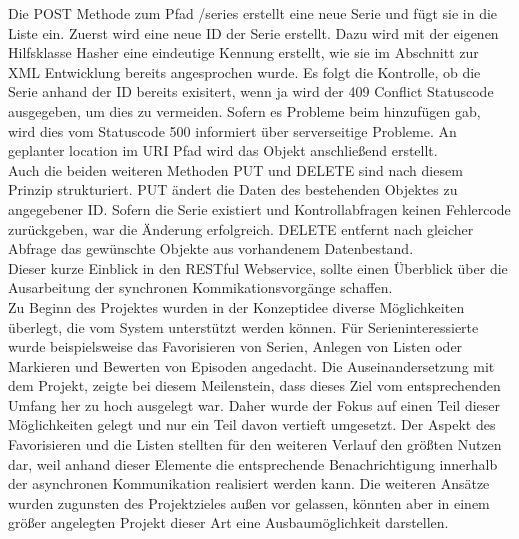 Die POST Methode zum Pfad /series erstellt eine neue Serie und fügt sie in die Liste ein. Zuerst wird eine neue ID der Serie erstellt. Dazu wird mit der eigenen Hilfsklasse Hasher eine eindeutige Kennung erstellt, wie sie im Abschnitt zur XML Entwicklung bereits angesprochen wurde. Es folgt die Kontrolle, ob die Serie anhand der ID bereits exisitert, wenn ja wird der 409 Conflict Statuscode ausgegeben, um dies zu vermeiden. Sofern es Probleme beim hinzufügen gab, wird dies vom Statuscode 500 informiert über serverseitige Probleme. An geplanter location im URI Pfad wird das Objekt anschließend erstellt.\\
Auch die beiden weiteren Methoden PUT und DELETE sind nach diesem Prinzip strukturiert. PUT ändert die Daten des bestehenden Objektes zu angegebener ID. Sofern die Serie existiert und Kontrollabfragen keinen Fehlercode zurückgeben, war die Änderung erfolgreich. DELETE entfernt nach gleicher Abfrage das gewünschte Objekte aus vorhandenem Datenbestand.\\

Dieser kurze Einblick in den RESTful Webservice, sollte einen Überblick über die Ausarbeitung der synchronen Kommikationsvorgänge schaffen. \\
Zu Beginn des Projektes wurden in der Konzeptidee diverse Möglichkeiten überlegt, die vom System unterstützt werden können. Für Serieninteressierte wurde beispielsweise das Favorisieren von Serien, Anlegen von Listen oder Markieren und Bewerten von Episoden angedacht. Die Auseinandersetzung mit dem Projekt, zeigte bei diesem Meilenstein, dass dieses Ziel vom entsprechenden Umfang her zu hoch ausgelegt war. Daher wurde der Fokus auf einen Teil dieser Möglichkeiten gelegt und nur ein Teil davon vertieft umgesetzt. Der Aspekt des Favorisieren und die Listen stellten für den weiteren Verlauf den größten Nutzen dar, weil anhand dieser Elemente die entsprechende Benachrichtigung innerhalb der asynchronen Kommunikation realisiert werden kann. Die weiteren Ansätze wurden zugunsten des Projektzieles außen vor gelassen, könnten aber in einem größer angelegten Projekt dieser Art eine Ausbaumöglichkeit darstellen.
